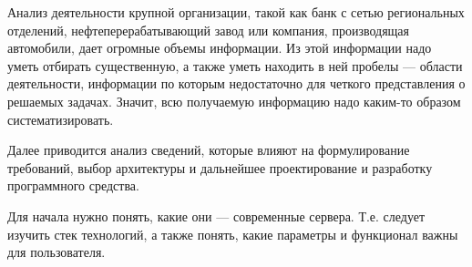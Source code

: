 Анализ деятельности крупной организации, такой как банк с сетью региональных отделений, нефтеперерабатывающий завод или компания, производящая автомобили, дает огромные объемы информации. Из этой информации надо уметь отбирать существенную, а также уметь находить в ней пробелы — области деятельности, информации по которым недостаточно для четкого представления о решаемых задачах. Значит, всю получаемую информацию надо каким-то образом систематизировать. 

Далее приводится анализ сведений, которые влияют на формулирование требований, выбор архитектуры и дальнейшее проектирование и разработку программного средства.

Для начала нужно понять, какие они — современные сервера. Т.е. следует изучить стек технологий, а также понять, какие параметры и функционал важны для пользователя.    














